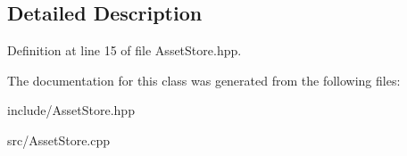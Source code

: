 \subsection{Detailed Description}


Definition at line 15 of file Asset\+Store.\+hpp.



The documentation for this class was generated from the following files\+:\begin{DoxyCompactItemize}
\item 
include/Asset\+Store.\+hpp\item 
src/Asset\+Store.\+cpp\end{DoxyCompactItemize}
